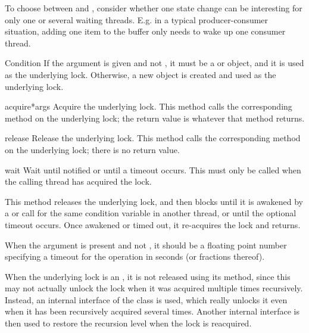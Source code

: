 To choose between  and , consider
whether one state change can be interesting for only one or several
waiting threads.  E.g. in a typical producer-consumer situation,
adding one item to the buffer only needs to wake up one consumer
thread.

\begin{classdesc}{Condition}{}
If the  argument is given and not , it must be a
 or  object, and it is used as the underlying
lock.  Otherwise, a new  object is created and used as
the underlying lock.
\end{classdesc}

\begin{methoddesc}{acquire}{*args}
Acquire the underlying lock.
This method calls the corresponding method on the underlying
lock; the return value is whatever that method returns.
\end{methoddesc}

\begin{methoddesc}{release}{}
Release the underlying lock.
This method calls the corresponding method on the underlying
lock; there is no return value.
\end{methoddesc}

\begin{methoddesc}{wait}{}
Wait until notified or until a timeout occurs.
This must only be called when the calling thread has acquired the
lock.

This method releases the underlying lock, and then blocks until it is
awakened by a  or  call for the
same condition variable in another thread, or until the optional
timeout occurs.  Once awakened or timed out, it re-acquires the lock
and returns.

When the  argument is present and not , it
should be a floating point number specifying a timeout for the
operation in seconds (or fractions thereof).

When the underlying lock is an , it is not released using
its  method, since this may not actually unlock the
lock when it was acquired multiple times recursively.  Instead, an
internal interface of the  class is used, which really
unlocks it even when it has been recursively acquired several times.
Another internal interface is then used to restore the recursion level
when the lock is reacquired.
\end{methoddesc}

